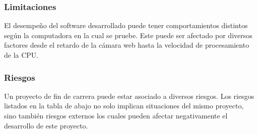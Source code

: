 \documentclass[a4paper,openright,12pt]{report}
\begin{document}
\subsubsection{Limitaciones}
El desempeño del software desarrollado puede tener comportamientos
distintos según la computadora en la cual se pruebe. Este puede ser
afectado por diversos factores desde el retardo de la cámara web hasta la
velocidad de procesamiento de la CPU.

\subsubsection{Riesgos}
Un proyecto de fin de carrera puede estar asociado a diversos riesgos. Los
riesgos listados en la tabla de abajo no solo implican situaciones del mismo
proyecto, sino también riesgos externos los cuales pueden afectar negativamente
el desarrollo de este proyecto.
\end{document}
